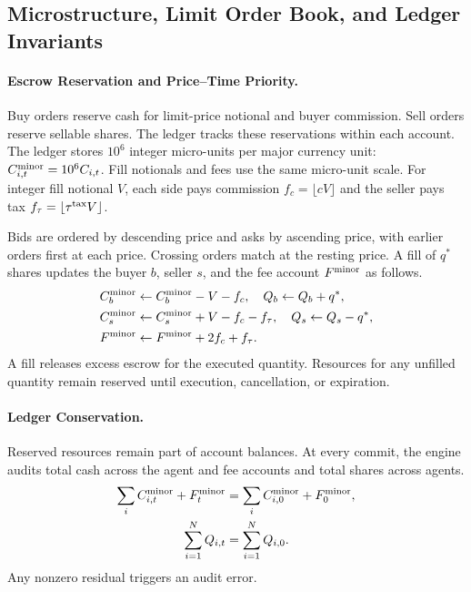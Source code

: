\subsection{Microstructure, Limit Order Book, and Ledger Invariants}
\label{sec:method:microstructure}

\paragraph{Escrow Reservation and Price--Time Priority.} Buy orders reserve cash for limit-price notional and buyer commission. Sell orders reserve sellable shares. The ledger tracks these reservations within each account. The ledger stores $10^6$ integer micro-units per major currency unit: $C_{i,t}^{\rm minor}=10^6 C_{i,t}$. Fill notionals and fees use the same micro-unit scale. For integer fill notional $V$, each side pays commission $f_c=\lfloor cV\rfloor$ and the seller pays tax $f_\tau=\lfloor\tau^{\rm tax}V\rfloor$.

Bids are ordered by descending price and asks by ascending price, with earlier orders first at each price. Crossing orders match at the resting price. A fill of $q^*$ shares updates the buyer $b$, seller $s$, and the fee account $F^{\rm minor}$ as follows.
\begin{align}
  C_b^{\rm minor} &\gets C_b^{\rm minor} - V-f_c, \quad Q_b \gets Q_b + q^*, \label{eq:settle_b} \\
  C_s^{\rm minor} &\gets C_s^{\rm minor} + V-f_c-f_\tau, \quad Q_s \gets Q_s - q^*, \label{eq:settle_s} \\
  F^{\rm minor} &\gets F^{\rm minor} +2f_c+f_\tau. \label{eq:settle_fees}
\end{align}
A fill releases excess escrow for the executed quantity. Resources for any unfilled quantity remain reserved until execution, cancellation, or expiration.

\paragraph{Ledger Conservation.} Reserved resources remain part of account balances. At every commit, the engine audits total cash across the agent and fee accounts and total shares across agents.
\begin{equation}
\begin{aligned}
 \sum_i C_{i,t}^{\rm minor}+F_t^{\rm minor}&=\sum_i C_{i,0}^{\rm minor}+F_0^{\rm minor},\\
 \sum_{i=1}^N Q_{i,t}&=\sum_{i=1}^N Q_{i,0}.
\end{aligned}
  \label{eq:invariants}
\end{equation}
Any nonzero residual triggers an audit error.

